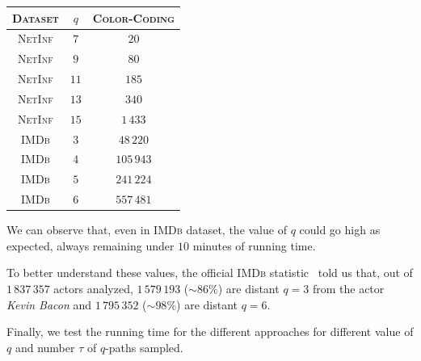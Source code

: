 \begin{table}[h]
	\centering
	\begin{tabular}{|c|c|c|}
		\hline
		\textsc{Dataset} & $q$  & \textsc{Color-Coding} \\ \hline \hline
		\textsc{NetInf}  & $7$  & $20$                  \\ \hline
		\textsc{NetInf}  & $9$  & $80$                  \\ \hline
		\textsc{NetInf}  & $11$ & $185$                 \\ \hline
		\textsc{NetInf}  & $13$ & $340$                 \\ \hline
		\textsc{NetInf}  & $15$ & $1\,433$              \\ \hline \hline
		\textsc{IMDb}    & $3$  & $48\,220$             \\ \hline
		\textsc{IMDb}    & $4$  & $105\,943$            \\ \hline
		\textsc{IMDb}    & $5$  & $241\,224$            \\ \hline
		\textsc{IMDb}    & $6$  & $557\,481$            \\ \hline
	\end{tabular}
\end{table}

We can observe that, even in \textsc{IMDb} dataset, the value of $q$ could go high as expected, always remaining under $10$ minutes of running time. \medskip

To better understand these values, the official \textsc{IMDb} statistic~\cite{imdbstat} told us that, out of $1\,837\,357$ actors analyzed, $1\,579\,193$ ($\sim86\%$) are distant $q=3$ from the actor \textit{Kevin Bacon} and $1\,795\,352$ ($\sim98\%$) are distant $q=6$.\medskip

Finally, we test the running time for the different approaches for different value of $q$ and number $\tau$ of $q$-paths sampled. 

